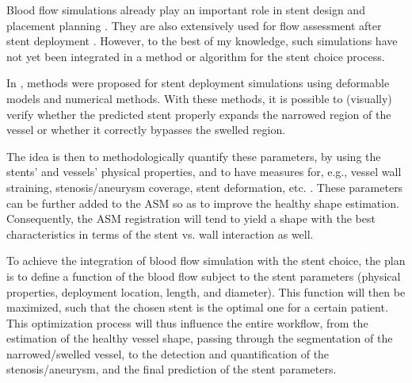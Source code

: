 Blood flow simulations already play an important role in stent design and placement planning \citep{deBeule,ATTI-08,Appanaboyina2009}. They are also extensively used for flow assessment after stent deployment \citep{Vuk,Gori,Appanaboyina2008,Cebral2011}. However, to the best of my knowledge, such simulations have not yet been integrated in a method or algorithm for the stent choice process. 

\approach
In \citep{Florez,deBeule}, methods were proposed for stent deployment simulations using deformable models and numerical methods. With these methods, it is possible to (visually) verify whether the predicted stent properly expands the narrowed region of the vessel or whether it correctly bypasses the swelled region. 

The idea is then to methodologically quantify these parameters, by using the stents' and vessels' physical properties, and to have measures for, e.g., vessel wall straining, stenosis/aneurysm coverage, stent deformation, etc. \citep{BOUS-09c,BOUS-08c,SULA-08a}. These parameters can be further added to the ASM so as to improve the healthy shape estimation. Consequently, the ASM registration will tend to yield a shape with the best characteristics in terms of the stent vs. wall interaction as well.

To achieve the integration of blood flow simulation with the stent choice, the plan is to define a function of the blood flow subject to the stent parameters (physical properties, deployment location, length, and diameter). This function will then be maximized, such that the chosen stent is the optimal one for a certain patient. This optimization process will thus influence the entire workflow, from the estimation of the healthy vessel shape, passing through the segmentation of the narrowed/swelled vessel, to the detection and quantification of the stenosis/aneurysm, and the final prediction of the stent parameters. 


